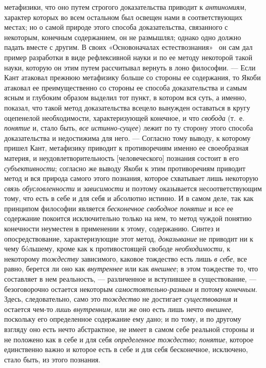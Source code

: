 \documentclass[twoside]{article}
\begin{document}
метафизики, что оно путем строгого доказательства приводит к
{\em антиномиям},
характер которых во всем остальном был освещен нами в
соответствующих местах; но о самой природе этого способа доказательства,
связанного с некоторым, конечным содержанием, он не размышлял; однако одно
должно падать вместе с другим. В своих «Основоначалах
естествознания»~\label{bkm:bm117}
он сам дал пример разработки в виде рефлексивной науки и по
ее методу некоторой такой науки, которую он этим путем рассчитывал вернуть
в лоно философии. — Если Кант атаковал прежнюю метафизику
больше со стороны ее содержания, то Якоби атаковал ее преимущественно со
стороны ее способа доказательства и самым ясным и глубоким образом выделил
тот пункт, в котором вся суть, а именно, показал, что такой метод
доказательства всецело вынужден оставаться в кругу оцепенелой
необходимости, характеризующей конечное, и что
{\em свобода} (т.~е.
{\em понятие} и, стало
быть, {\em все
истинно-}{\em сущее})
лежит по ту сторону этого способа доказательства и
недостижима для него. — Согласно тому выводу, к которому
пришел Кант, метафизику приводит к противоречиям именно ее своеобразная
материя, и неудовлетворительность [человеческого] познания состоит в его
{\em субъективности};
согласно же выводу Якоби к этим противоречиям приводит метод
и вся природа самого этого познания, которое схватывает лишь некоторую
{\em связь обусловленности}
и {\em зависимости}
и поэтому оказывается несоответствующим тому, что есть в себе
и для себя и абсолютно истинно. И в самом деле, так как принципом философии
является {\em бесконечное свободное
понятие} и все ее содержание покоится исключительно только
на нем, то метод чуждой понятию конечности неуместен в применении к этому,
содержанию. Синтез и опосредствование, характеризующие этот метод,
{\em доказывание} не
приводит ни к чему бóльшему, кроме как к противостоящей свободе
{\em необходимости}, к
некоторому {\em тождеству}
зависимого, каковое тождество есть лишь
{\em в себе}, все равно,
берется ли оно как {\em внутреннее}
или как {\em внешнее};
в этом тождестве то, что составляет в нем реальность, —
различенное и вступившее в существование, —
безоговорочно остается некоторым
{\em самостоятельно-разным}
и потому {\em конечным}.
Здесь, следовательно, само это
{\em тождество} не
достигает {\em существования}
и остается чем-то
{\em лишь внутренним},
или же оно есть лишь нечто
{\em внешнее}, поскольку
его определенное содержание ему дано; и по тому, и по другому взгляду оно
есть нечто абстрактное, не имеет в самом себе реальной стороны и не
положено как в себе и для себя
{\em определенное тождество};
{\em понятие}, которое
единственно важно и которое есть в себе и для себя бесконечное, исключено,
стало быть, из этого познания.
\end{document}
